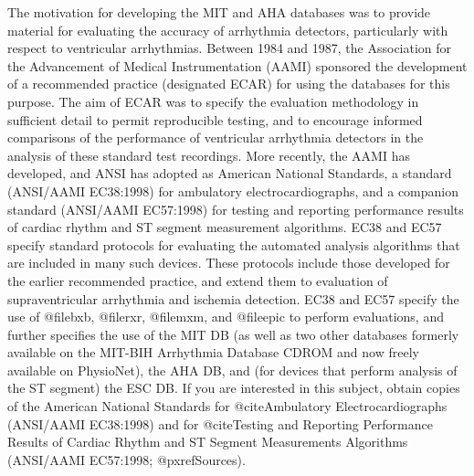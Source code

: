 {{{{{{{{The motivation for developing the MIT and AHA databases was to provide
material for evaluating the accuracy of arrhythmia detectors,
particularly with respect to ventricular arrhythmias.  Between 1984
and 1987, the Association for the Advancement of Medical
Instrumentation (AAMI) sponsored the development of a recommended
practice (designated ECAR) for using the databases for this purpose.
The aim of ECAR was to specify the evaluation methodology in
sufficient detail to permit reproducible testing, and to encourage
informed comparisons of the performance of ventricular arrhythmia
detectors in the analysis of these standard test recordings.  More
recently, the AAMI has developed, and ANSI has adopted as American
National Standards, a standard (ANSI/AAMI EC38:1998) for ambulatory
electrocardiographs, and a companion standard (ANSI/AAMI EC57:1998)
for testing and reporting performance results of cardiac rhythm and ST
segment measurement algorithms.  EC38 and EC57 specify standard
protocols for evaluating the automated analysis algorithms that are
included in many such devices.  These protocols include those
developed for the earlier recommended practice, and extend them to
evaluation of supraventricular arrhythmia and ischemia detection.
EC38 and EC57 specify the use of @file{bxb}, @file{rxr}, @file{mxm},
and @file{epic} to perform evaluations, and further specifies the use
of the MIT DB (as well as two other databases formerly available on
the MIT-BIH Arrhythmia Database CDROM and now freely available on
PhysioNet), the AHA DB, and (for devices that perform analysis of the
ST segment) the ESC DB.  If you are interested in this subject, obtain
copies of the American National Standards for @cite{Ambulatory
Electrocardiographs} (ANSI/AAMI EC38:1998) and for @cite{Testing and
Reporting Performance Results of Cardiac Rhythm and ST Segment
Measurements Algorithms} (ANSI/AAMI EC57:1998; @pxref{Sources}).

}}}}}}}}
